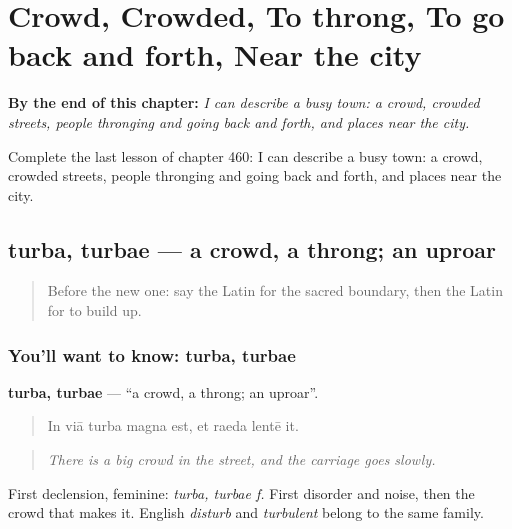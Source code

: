 
\chapter{Crowd, Crowded, To throng, To go back and forth, Near the city}
\label{ch:la-crowd-crowded-to-throng-to-go-back-and-forth-near-the-city}

\begin{chapteropening}
\textbf{By the end of this chapter:} \emph{I can describe a busy town: a crowd, crowded streets, people thronging and going back and forth, and places near the city.}

Complete the last lesson of chapter 460: I can describe a busy town: a crowd, crowded streets, people thronging and going back and forth, and places near the city.
\end{chapteropening}

\section[turba, turbae]{turba, turbae — a crowd, a throng; an uproar}

\label{lesson:LA-C460-turba}



\begin{quote}
Before the new one: say the Latin for the sacred boundary, then the Latin for to build up.
\end{quote}

\subsection*{You'll want to know: turba, turbae}
\textbf{turba, turbae} — \textquotedblleft{}a crowd, a throng; an uproar\textquotedblright{}.

\begin{quote}
In viā turba magna est, et raeda lentē it.
\end{quote}

\begin{quote}
\emph{There is a big crowd in the street, and the carriage goes slowly.}
\end{quote}

First declension, feminine: \emph{turba, turbae f.} First disorder and noise, then the crowd that makes it. English \emph{disturb} and \emph{turbulent} belong to the same family.

